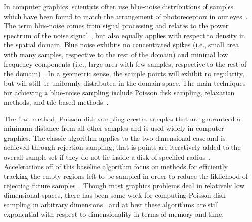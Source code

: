 In computer graphics, scientists often use blue-noise distributions of samples which have been found to match the arrangement of photoreceptors in our eyes~\cite{Yellott1982}.
%
The term blue-noise comes from signal processing and relates to the power spectrum of the noise signal~\cite{Tuzlukov2002}, but also equally applies with respect to density in the spatial domain.
%
Blue noise exhibits no concentrated spikes (i.e., small area with many samples, respective to the rest of the domain) and minimal low frequency components (i.e., large area with few samples, respective to the rest of the domain)~\cite{YanGuoWang2015}.
%
In a geometric sense, the sample points will exhibit no regularity, but will still be uniformly distributed in the domain space.
%
The main techniques for achieving a blue-noise sampling include Poisson disk sampling, relaxation methods, and tile-based methods~\cite{YanGuoWang2015}.

The first method, Poisson disk sampling creates samples that are guaranteed a minimum distance from all other samples and is used widely in computer graphics.
%
The classic algorithm applies to the two dimensional case and is achieved through rejection sampling, that is points are iteratively added to the overall sample set if they do not lie inside a disk of specified radius~\cite{Cook1986}.
%
Accelerations off of this baseline algorithm focus on methods for efficiently tracking the empty regions left to be sampled in order to reduce the likliehood of rejecting future samples~\cite{EbeidaDavidsonPatney2011,EbeidaMitchellPatney2012,GamitoMaddock2009,Jones2006,JonesKarger2011,WhiteClineEgbert2007}.
%
Though most graphics problems deal in relatively low dimensional spaces, there has been some work for computing Poisson disk sampling in arbitrary dimensions~\cite{Bridson2007,EbeidaMitchellPatney2012,EbeidaMitchellPatney2015,GamitoMaddock2009} and at best these algorithms are still exponential with respect to dimensionality in terms of memory and time.


